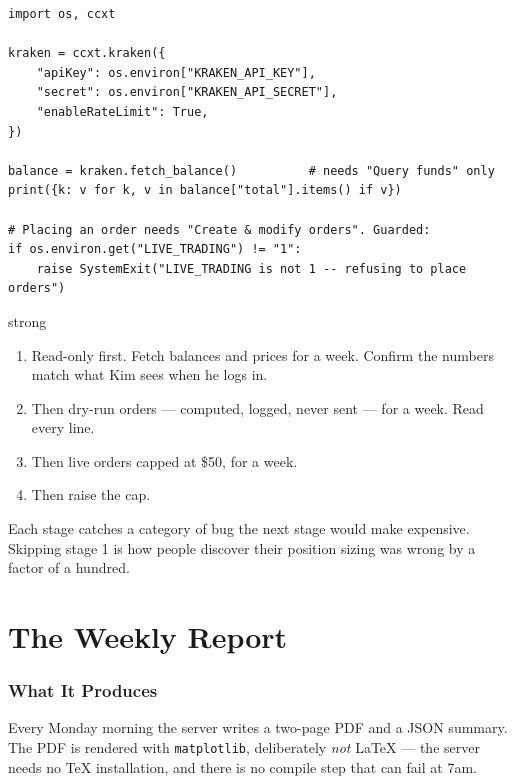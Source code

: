 \documentclass[11pt,a4paper]{article}
\begin{document}
\begin{codebox}
\begin{lstlisting}[style=py]
import os, ccxt

kraken = ccxt.kraken({
    "apiKey": os.environ["KRAKEN_API_KEY"],
    "secret": os.environ["KRAKEN_API_SECRET"],
    "enableRateLimit": True,
})

balance = kraken.fetch_balance()          # needs "Query funds" only
print({k: v for k, v in balance["total"].items() if v})

# Placing an order needs "Create & modify orders". Guarded:
if os.environ.get("LIVE_TRADING") != "1":
    raise SystemExit("LIVE_TRADING is not 1 -- refusing to place orders")
\end{lstlisting}
\end{codebox}

\begin{resultbox}{strong}
\begin{enumerate}[leftmargin=1.5em, topsep=2pt]
    \item Read-only first. Fetch balances and prices for a week.
          Confirm the numbers match what Kim sees when he logs in.
    \item Then dry-run orders --- computed, logged, never sent ---
          for a week. Read every line.
    \item Then live orders capped at \$50, for a week.
    \item Then raise the cap.
\end{enumerate}
Each stage catches a category of bug the next stage would make
expensive. Skipping stage 1 is how people discover their position
sizing was wrong by a factor of a hundred.
\end{resultbox}

\part{The Weekly Report}

\section{What It Produces}

Every Monday morning the server writes a two-page PDF and a JSON
summary. The PDF is rendered with \texttt{matplotlib}, deliberately
\emph{not} LaTeX --- the server needs no TeX installation, and there is
no compile step that can fail at 7am.
\end{document}
